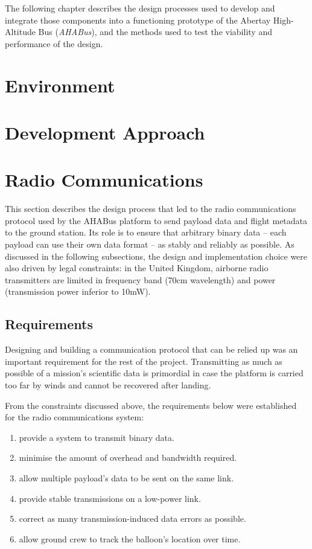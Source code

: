 The following chapter describes the design processes used to develop and
integrate those components into a functioning prototype of the Abertay
High-Altitude Bus (\textit{AHABus}), and the methods used to test the viability
and performance of the design.

\section{Environment}

\section{Development Approach}

\section{Radio Communications}
\label{sec:radio-coms}

This section describes the design process that led to the radio communications
protocol used by the AHABus platform to send payload data and flight metadata
to the ground station. Its role is to ensure that arbitrary binary data – each
payload can use their own data format – as stably and reliably as possible. As
discussed in the following subsections, the design and implementation choice
were also driven by legal constraints: in the United Kingdom, airborne radio
transmitters are limited in frequency band (70cm wavelength) and power
(transmission power inferior to 10mW).

\subsection{Requirements}
\label{ssec:requirements}

Designing and building a communication protocol that can be relied up was an
important requirement for the rest of the project. Transmitting as much as
possible of a mission's scientific data is primordial in case the platform
is carried too far by winds and cannot be recovered after landing.

From the constraints discussed above, the requirements below were established
for the radio communications system:

\begin{enumerate}
\item provide a system to transmit binary data.%
\item minimise the amount of overhead and bandwidth required.%
\item allow multiple payload's data to be sent on the same link.%
\item provide stable transmissions on a low-power link.%
\item correct as many transmission-induced data errors as possible.%
\item allow ground crew to track the balloon's location over time.%
\end{enumerate}

